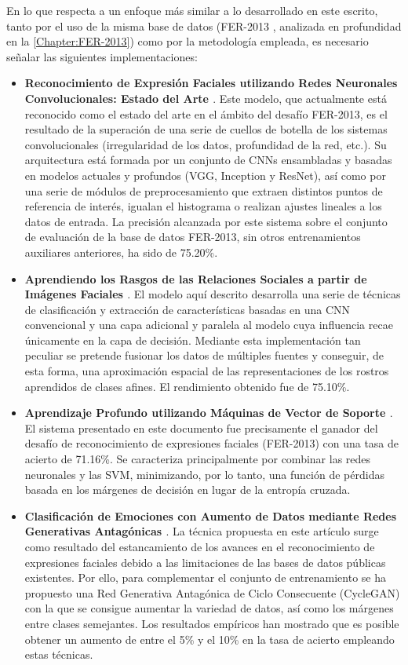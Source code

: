 En lo que respecta a un enfoque más similar a lo desarrollado en este escrito, tanto por el uso de la misma base de datos (FER-2013 \cite{FER-2013}, analizada en profundidad en la \autoref{Chapter:FER-2013}) como por la metodología empleada, es necesario señalar las siguientes implementaciones:
\begin{itemize}
  \item \textbf{Reconocimiento de Expresión Faciales utilizando Redes Neuronales Convolucionales: Estado del Arte \cite{Pramerdorfer}}. Este modelo, que actualmente está reconocido como el estado del arte en el ámbito del desafío FER-2013, es el resultado de la superación de una serie de cuellos de botella de los sistemas convolucionales (irregularidad de los datos, profundidad de la red, etc.). Su arquitectura está formada por un conjunto de CNNs ensambladas y basadas en modelos actuales y profundos (VGG, Inception y ResNet), así como por una serie de módulos de preprocesamiento que extraen distintos puntos de referencia de interés, igualan el histograma o realizan ajustes lineales a los datos de entrada. La precisión alcanzada por este sistema sobre el conjunto de evaluación de la base de datos FER-2013, sin otros entrenamientos auxiliares anteriores, ha sido de 75.20\%.
  \item \textbf{Aprendiendo los Rasgos de las Relaciones Sociales a partir de Imágenes Faciales \cite{Zhang}}. El modelo aquí descrito desarrolla una serie de técnicas de clasificación y extracción de características basadas en una CNN convencional y una capa adicional y paralela al modelo cuya influencia recae únicamente en la capa de decisión. Mediante esta implementación tan peculiar se pretende fusionar los datos de múltiples fuentes y conseguir, de esta forma, una aproximación espacial de las representaciones de los rostros aprendidos de clases afines. El rendimiento obtenido fue de 75.10\%.
  \item \textbf{Aprendizaje Profundo utilizando Máquinas de Vector de Soporte \cite{DeepSVM}}. El sistema presentado en este documento fue precisamente el ganador del desafío de reconocimiento de expresiones faciales (FER-2013) con una tasa de acierto de 71.16\%. Se caracteriza principalmente por combinar las redes neuronales y las SVM, minimizando, por lo tanto, una función de pérdidas basada en los márgenes de decisión en lugar de la entropía cruzada.
  \item \textbf{Clasificación de Emociones con Aumento de Datos mediante Redes Generativas Antagónicas \cite{GANAugmentation}}. La técnica propuesta en este artículo surge como resultado del estancamiento de los avances en el reconocimiento de expresiones faciales debido a las limitaciones de las bases de datos públicas existentes. Por ello, para complementar el conjunto de entrenamiento se ha propuesto una Red Generativa Antagónica de Ciclo Consecuente (CycleGAN) \cite{cycleGAN} con la que se consigue aumentar la variedad de datos, así como los márgenes entre clases semejantes. Los resultados empíricos han mostrado que es posible obtener un aumento de entre el 5\% y el 10\% en la tasa de acierto empleando estas técnicas.

\end{itemize}

